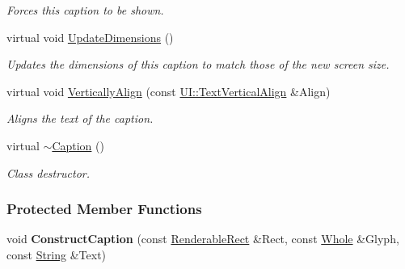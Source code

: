 \begin{DoxyCompactItemize}
\begin{DoxyCompactList}\small\item\em Forces this caption to be shown. \item\end{DoxyCompactList}\item 
virtual void \hyperlink{classMezzanine_1_1UI_1_1Caption_ab6c528d41fb194d19b2ec426a9d95db7}{UpdateDimensions} ()
\begin{DoxyCompactList}\small\item\em Updates the dimensions of this caption to match those of the new screen size. \item\end{DoxyCompactList}\item 
virtual void \hyperlink{classMezzanine_1_1UI_1_1Caption_aa6b18dfcd49114eee5e785971c1c9440}{VerticallyAlign} (const \hyperlink{namespaceMezzanine_1_1UI_ab35e3845e2541698245262cc17147ae9}{UI::TextVerticalAlign} \&Align)
\begin{DoxyCompactList}\small\item\em Aligns the text of the caption. \item\end{DoxyCompactList}\item 
\hypertarget{classMezzanine_1_1UI_1_1Caption_a3b6b1682c67c591ee4e19ed9e9dded74}{
virtual \hyperlink{classMezzanine_1_1UI_1_1Caption_a3b6b1682c67c591ee4e19ed9e9dded74}{$\sim$Caption} ()}
\label{classMezzanine_1_1UI_1_1Caption_a3b6b1682c67c591ee4e19ed9e9dded74}

\begin{DoxyCompactList}\small\item\em Class destructor. \item\end{DoxyCompactList}\end{DoxyCompactItemize}
\subsubsection*{Protected Member Functions}
\begin{DoxyCompactItemize}
\item 
\hypertarget{classMezzanine_1_1UI_1_1Caption_a9315c9491485177f2189cebab864d950}{
void {\bfseries ConstructCaption} (const \hyperlink{structMezzanine_1_1UI_1_1RenderableRect}{RenderableRect} \&Rect, const \hyperlink{namespaceMezzanine_adcbb6ce6d1eb4379d109e51171e2e493}{Whole} \&Glyph, const \hyperlink{namespaceMezzanine_acf9fcc130e6ebf08e3d8491aebcf1c86}{String} \&Text)}
\label{classMezzanine_1_1UI_1_1Caption_a9315c9491485177f2189cebab864d950}

\end{DoxyCompactItemize}
